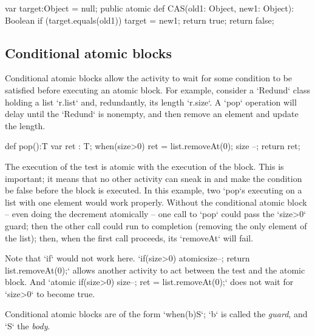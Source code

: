 \begin{xten}
var target:Object = null;
public atomic def CAS(old1: Object, new1: Object): Boolean {
   if (target.equals(old1)) {
     target = new1;
     return true;
   }
   return false;
}
\end{xten}

\subsection{Conditional atomic blocks}



Conditional atomic blocks allow the activity to wait for some condition to be
satisfied before executing an atomic block. For example, consider a
\xcd`Redund` class holding a list \xcd`r.list` and, redundantly, its length
\xcd`r.size`.  A \xcd`pop` operation will delay until the \xcd`Redund` is
nonempty, and then remove an element and update the length.  
\begin{xten}
def pop():T {
  var ret : T;
  when(size>0) {
    ret = list.removeAt(0);
    size --;
    }
  return ret;
}
\end{xten}


The execution of the test is atomic with the execution of the block.  This is
important; it means that no other activity can sneak in and make the condition
be false before the block is executed.  In this example, two \xcd`pop`s
executing on a list with one element would work properly. Without the
conditional atomic block -- even doing the decrement atomically -- one call to
\xcd`pop` could pass the \xcd`size>0` guard; then the other call could run to
completion (removing the only element of the list); then, when the first call
proceeds, its \xcd`removeAt` will fail.  

Note that \xcd`if` would not work here.  
\xcd`if(size>0) atomic{size--; return list.removeAt(0);}` allows another
activity to act between the test and the atomic block.  
And 
\xcd`atomic{ if(size>0) {size--; ret = list.removeAt(0);}}` 
does not wait for \xcd`size>0` to become true.


Conditional atomic blocks are of the form \xcd`when(b)S`; 
\xcd`b` is called the {\em guard}, and \xcd`S` the {\em body}.

